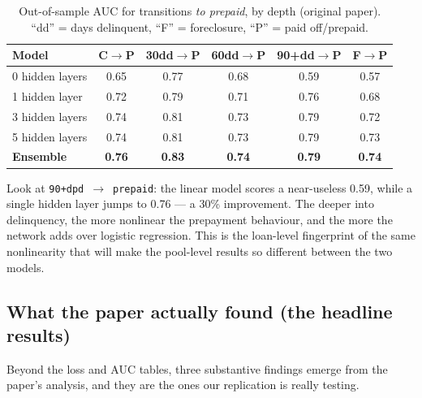\documentclass[11pt]{article}
\newcommand{\state}[1]{\texttt{#1}}
\begin{document}
\begin{table}[H]
\centering
\caption{Out-of-sample AUC for transitions \emph{to prepaid}, by depth (original paper).
``dd'' = days delinquent, ``F'' = foreclosure, ``P'' = paid off/prepaid.}
\vspace{2pt}
\begin{tabular}{lccccc}
\toprule
\textbf{Model} & C$\to$P & 30dd$\to$P & 60dd$\to$P & 90+dd$\to$P & F$\to$P \\
\midrule
0 hidden layers & 0.65 & 0.77 & 0.68 & 0.59 & 0.57 \\
1 hidden layer  & 0.72 & 0.79 & 0.71 & 0.76 & 0.68 \\
3 hidden layers & 0.74 & 0.81 & 0.73 & 0.79 & 0.72 \\
5 hidden layers & 0.74 & 0.81 & 0.73 & 0.79 & 0.73 \\
\textbf{Ensemble} & \textbf{0.76} & \textbf{0.83} & \textbf{0.74} & \textbf{0.79} & \textbf{0.74} \\
\bottomrule
\end{tabular}
\end{table}

\begin{intuition}
Look at \state{90+dpd}~$\to$~\state{prepaid}: the linear model scores a near-useless 0.59,
while a single hidden layer jumps to 0.76 --- a 30\% improvement. The deeper into delinquency,
the more nonlinear the prepayment behaviour, and the more the network adds over logistic
regression. This is the loan-level fingerprint of the same nonlinearity that will make the
pool-level results so different between the two models.
\end{intuition}

\subsection{What the paper actually found (the headline results)}

Beyond the loss and AUC tables, three substantive findings emerge from the paper's analysis,
and they are the ones our replication is really testing.
\end{document}
